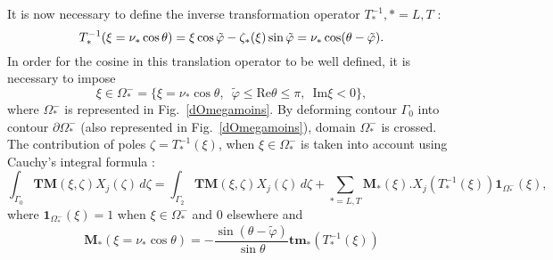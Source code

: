 It is now necessary to define the inverse transformation operator $T_*^{-1}, *=L,T$ :
\begin{equation}
T_*^{-1}(\xi=\nu_*\cos\theta)=\xi \cos \tilde{\varphi}-\zeta_*(\xi)\sin\tilde{\varphi}=\nu_*\cos(\theta-\tilde{\varphi}).
\end{equation}
In order for the cosine in this translation operator to be well defined, it is necessary to impose
\begin{equation}
\xi \in \Omega_*^-=\{\xi=\nu_*\cos\theta, \, \, \, \tilde{\varphi}\leq \mbox{Re}\theta\leq\pi, \, \, \, \mbox{Im}\xi< 0\},
\end{equation}
where $\Omega_*^-$ is represented in Fig.~\ref{dOmegamoins}. By deforming contour $\Gamma_0$ into contour $\partial \Omega_*^-$ (also represented in Fig.~\ref{dOmegamoins}), domain $\Omega_*^-$ is crossed. The contribution of poles $\zeta=T_*^{-1}(\xi)$, when $\xi\in\Omega_*^-$  is taken into account using Cauchy's integral formula :
\begin{equation}
\int_{\Gamma_0} \textbf{TM}(\xi,\zeta)X_j(\zeta)\, d\zeta = \int_{\Gamma_2}  \textbf{TM}(\xi,\zeta)X_j(\zeta)\, d\zeta+\sum_{*=L,T} \mathbf{M}_*(\xi).X_j(T^{-1}_*(\xi))\textbf{1}_{\Omega_*^-}(\xi),
\label{TM2}
\end{equation}
where $\textbf{1}_{\Omega_*^-}(\xi)=1$ when $\xi \in \Omega_*^-$ and $0$ elsewhere and
\begin{equation}
\mathbf{M}_*(\xi=\nu_*\cos\theta)=-\frac{\sin(\theta-\tilde{\varphi})}{\sin\theta} \textbf{tm}_*(T_*^{-1}(\xi))
\end{equation}

